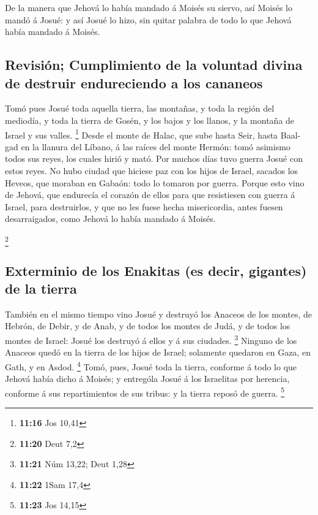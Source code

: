  De la manera que Jehová lo había mandado á Moisés su
siervo, así Moisés lo mandó á Josué: y así Josué lo hizo, sin quitar
palabra de todo lo que Jehová había mandado á Moisés.

\hypertarget{revisiuxf3n-cumplimiento-de-la-voluntad-divina-de-destruir-endureciendo-a-los-cananeos}{%
\subsection{Revisión; Cumplimiento de la voluntad divina de destruir
endureciendo a los
cananeos}\label{revisiuxf3n-cumplimiento-de-la-voluntad-divina-de-destruir-endureciendo-a-los-cananeos}}

 Tomó pues Josué toda aquella tierra, las montañas, y toda
la región del mediodía, y toda la tierra de Gosén, y los bajos y los
llanos, y la montaña de Israel y sus valles. \footnote{\textbf{11:16}
  Jos 10,41}  Desde el monte de Halac, que sube hasta Seir,
hasta Baal-gad en la llanura del Líbano, á las raíces del monte Hermón:
tomó asimismo todos sus reyes, los cuales hirió y mató. 
Por muchos días tuvo guerra Josué con estos reyes.  No hubo
ciudad que hiciese paz con los hijos de Israel, sacados los Heveos, que
moraban en Gabaón: todo lo tomaron por guerra.  Porque esto
vino de Jehová, que endurecía el corazón de ellos para que resistiesen
con guerra á Israel, para destruirlos, y que no les fuese hecha
misericordia, antes fuesen desarraigados, como Jehová lo había mandado á
Moisés.

\footnote{\textbf{11:20} Deut 7,2}

\hypertarget{exterminio-de-los-enakitas-es-decir-gigantes-de-la-tierra}{%
\subsection{Exterminio de los Enakitas (es decir, gigantes) de la
tierra}\label{exterminio-de-los-enakitas-es-decir-gigantes-de-la-tierra}}

 También en el mismo tiempo vino Josué y destruyó los
Anaceos de los montes, de Hebrón, de Debir, y de Anab, y de todos los
montes de Judá, y de todos los montes de Israel: Josué los destruyó á
ellos y á sus ciudades. \footnote{\textbf{11:21} Núm 13,22; Deut 1,28}
 Ninguno de los Anaceos quedó en la tierra de los hijos de
Israel; solamente quedaron en Gaza, en Gath, y en Asdod. \footnote{\textbf{11:22}
  1Sam 17,4}  Tomó, pues, Josué toda la tierra, conforme á
todo lo que Jehová había dicho á Moisés; y entrególa Josué á los
Israelitas por herencia, conforme á sus repartimientos de sus tribus: y
la tierra reposó de guerra. \footnote{\textbf{11:23} Jos 14,15}

